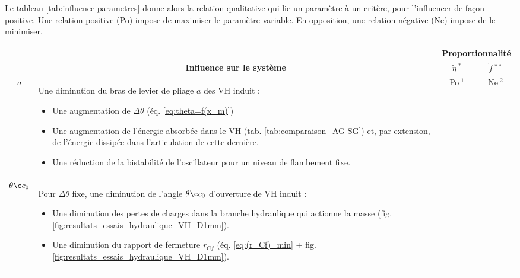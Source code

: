 Le tableau \ref{tab:influence parametres} donne alors la relation qualitative qui lie un paramètre à un critère, pour l'influencer de façon positive. Une relation positive (\textcolor{mygreen2}{Po}) impose de maximiser le paramètre variable. En opposition, une relation négative (\textcolor{Rouge1}{Ne}) impose de le minimiser.
\newpage %
\begin{landscape}
\begin{table}[!htbp]
\centering
\footnotesize	
\begin{threeparttable}
		\begin{tabular}{ c | m{19cm} | c | c }			
\toprule
\rowcolor{blue!10}    	
\multicolumn{1}{c}{} & \multicolumn{1}{c}{} & \multicolumn{2}{c}{\textbf{Proportionnalité}}\\
\cline{3-4}
\rowcolor{blue!10}    
\multicolumn{1}{c}{\multirow{-2}{*}{\textbf{Symbole}}}												&
\multicolumn{1}{c}{\multirow{-2}{*}{\textbf{Influence sur le système}}}								& 
\multicolumn{1}{c}{\textbf{$\tilde{\eta}~^{*}$}} & \multicolumn{1}{c}{\textbf{$\tilde{f}~^{**}$}}	\\ 
\midrule
\rowcolor{black!8} 
\normalsize{$a$} & Une diminution du bras de levier de pliage $a$ des VH induit :
\begin{itemize}[label=$\bullet$] 
	\item Une augmentation de $\Delta\theta$ (éq. \ref{eq:theta=f(x_m)})
	\item Une augmentation de l'énergie absorbée dans le VH (tab. \ref{tab:comparaison_AG-SG}) et, par extension, de l'énergie dissipée dans l'articulation de cette dernière.
 	\item Une réduction de la bistabilité de l'oscillateur pour un niveau de flambement fixe.
\end{itemize}
& \textcolor{mygreen2}{Po}$~^1$ 	&	\textcolor{Rouge1}{Ne}$~^2$		\\ 
\normalsize{$\thetaç_0$} & Pour $\Delta\theta$ fixe, une diminution de l'angle $\thetaç_0$ d'ouverture de VH induit :
\begin{itemize}[label=$\bullet$] 
	\item Une diminution des pertes de charges dans la branche hydraulique qui actionne la masse (fig. \ref{fig:resultats_essais_hydraulique_VH_D1mm}).
 	\item Une diminution du rapport de fermeture $r_{Cf}$ (éq. \ref{eq:(r_Cf)_min} + fig. \ref{fig:resultats_essais_hydraulique_VH_D1mm}).
\end{itemize}

\end{tabular}
\end{threeparttable}
\end{table}
\end{landscape}
